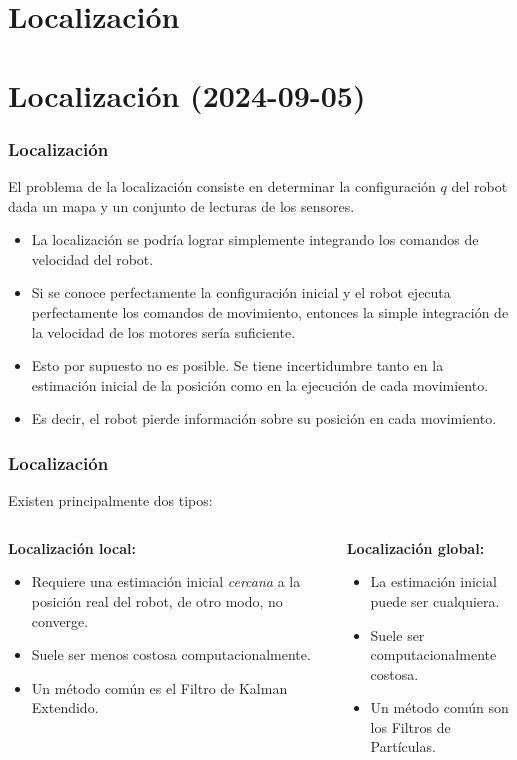 \section{Localización}
\section{Localización (2024-09-05)}
\begin{frame}\frametitle{Localización}
  El problema de la localización consiste en determinar la configuración $q$ del robot dada un mapa y un conjunto de lecturas de los sensores.
  \begin{itemize}
  \item La localización se podría lograr simplemente integrando los comandos de velocidad del robot.
  \item Si se conoce perfectamente la configuración inicial y el robot ejecuta perfectamente los comandos de movimiento, entonces la simple integración de la velocidad de los motores sería suficiente.
  \item Esto por supuesto no es posible. Se tiene incertidumbre tanto en la estimación inicial de la posición como en la ejecución de cada movimiento.
  \item Es decir, el robot pierde información sobre su posición en cada movimiento. 
  \end{itemize}
\end{frame}

\begin{frame}\frametitle{Localización}
  Existen principalmente dos tipos:
\[\]
  \begin{columns}
    \begin{column}{0.5\textwidth}
      \textbf{Localización local: }
      \begin{itemize}
      \item Requiere una estimación inicial \textit{cercana} a la posición real del robot, de otro modo, no converge.
      \item Suele ser menos costosa computacionalmente.
      \item Un método común es el Filtro de Kalman Extendido.
      \end{itemize}
    \end{column}
    \begin{column}{0.5\textwidth}
      \textbf{Localización global:}
      \begin{itemize}
      \item La estimación inicial puede ser cualquiera.
      \item Suele ser computacionalmente costosa.
      \item Un método común son los Filtros de Partículas. 
      \end{itemize}
      \[\]
      \[\]
    \end{column}
  \end{columns}
\end{frame}

